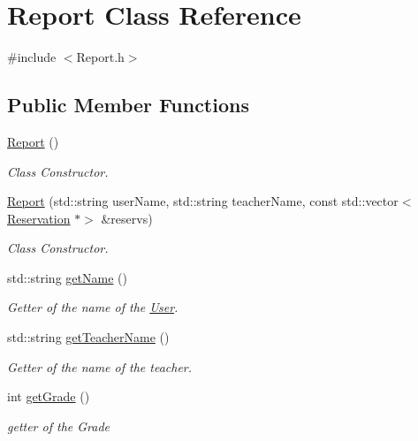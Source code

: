 \hypertarget{class_report}{}\section{Report Class Reference}
\label{class_report}


{\ttfamily \#include $<$Report.\+h$>$}

\subsection*{Public Member Functions}
\begin{DoxyCompactItemize}
\item 
\mbox{\label{class_report_ae3150817fcf4ebf814358baf5bd72e8f}} 
\mbox{\hyperlink{class_report_ae3150817fcf4ebf814358baf5bd72e8f}{Report}} ()
\begin{DoxyCompactList}\small\item\em Class Constructor. \end{DoxyCompactList}\item 
\mbox{\hyperlink{class_report_afb6a4377db483370b342b18211008664}{Report}} (std\+::string user\+Name, std\+::string teacher\+Name, const std\+::vector$<$ \mbox{\hyperlink{class_reservation}{Reservation}} $\ast$$>$ \&reservs)
\begin{DoxyCompactList}\small\item\em Class Constructor. \end{DoxyCompactList}\item 
std\+::string \mbox{\hyperlink{class_report_aaeac48b6c10c5bbf240fc518b6d45d05}{get\+Name}} ()
\begin{DoxyCompactList}\small\item\em Getter of the name of the \mbox{\hyperlink{class_user}{User}}. \end{DoxyCompactList}\item 
std\+::string \mbox{\hyperlink{class_report_af7c52b70f5fe6feae64e44affa6095cd}{get\+Teacher\+Name}} ()
\begin{DoxyCompactList}\small\item\em Getter of the name of the teacher. \end{DoxyCompactList}\item 
int \mbox{\hyperlink{class_report_a56fcac206c401ebc51d35fbe907ad729}{get\+Grade}} ()
\begin{DoxyCompactList}\small\item\em getter of the Grade \end{DoxyCompactList}\item 
$$
\end{DoxyCompactItemize}
